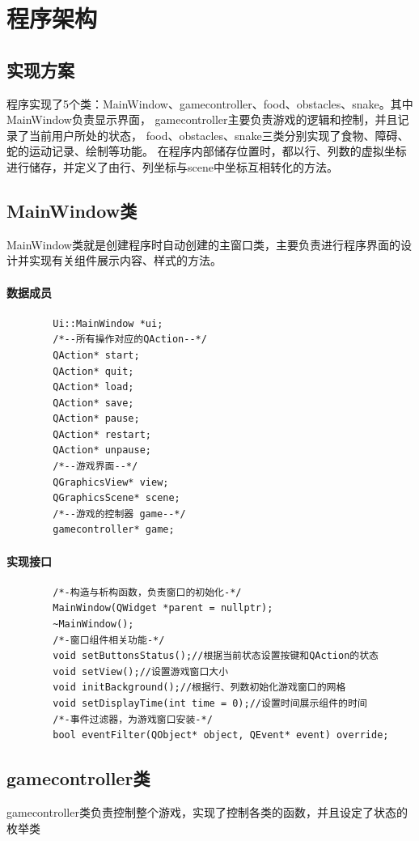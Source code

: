 \documentclass[utf-8]{ctexart}
\begin{document}
    \section{程序架构}
    \subsection{实现方案}
    程序实现了5个类：MainWindow、gamecontroller、food、obstacles、snake。其中MainWindow负责显示界面，
    gamecontroller主要负责游戏的逻辑和控制，并且记录了当前用户所处的状态，
    food、obstacles、snake三类分别实现了食物、障碍、蛇的运动记录、绘制等功能。
    在程序内部储存位置时，都以行、列数的虚拟坐标进行储存，并定义了由行、列坐标与scene中坐标互相转化的方法。
    \subsection{MainWindow类}
    MainWindow类就是创建程序时自动创建的主窗口类，主要负责进行程序界面的设计并实现有关组件展示内容、样式的方法。
    \paragraph{数据成员}
    \begin{lstlisting}
        Ui::MainWindow *ui;
        /*--所有操作对应的QAction--*/
        QAction* start;
        QAction* quit;
        QAction* load;
        QAction* save;
        QAction* pause;
        QAction* restart;
        QAction* unpause;
        /*--游戏界面--*/
        QGraphicsView* view;
        QGraphicsScene* scene;
        /*--游戏的控制器 game--*/
        gamecontroller* game;
    \end{lstlisting}
    \paragraph{实现接口}
    \begin{lstlisting}
        /*-构造与析构函数，负责窗口的初始化-*/
        MainWindow(QWidget *parent = nullptr);
        ~MainWindow();
        /*-窗口组件相关功能-*/
        void setButtonsStatus();//根据当前状态设置按键和QAction的状态
        void setView();//设置游戏窗口大小
        void initBackground();//根据行、列数初始化游戏窗口的网格
        void setDisplayTime(int time = 0);//设置时间展示组件的时间
        /*-事件过滤器，为游戏窗口安装-*/
        bool eventFilter(QObject* object, QEvent* event) override;
    \end{lstlisting}
    \subsection{gamecontroller类}
    gamecontroller类负责控制整个游戏，实现了控制各类的函数，并且设定了状态的枚举类
\end{document}
